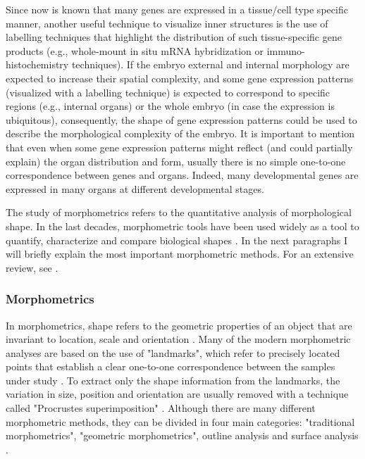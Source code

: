 Since now is known that many genes are expressed in a tissue/cell type specific manner, another useful technique to visualize inner structures is the use of labelling techniques that highlight the distribution of such tissue-specific gene products (e.g., whole-mount in situ mRNA hybridization or immuno-histochemistry techniques). 
If the embryo external and internal morphology are expected to increase their spatial complexity, and some gene expression patterns (visualized with a labelling technique) is expected to correspond to specific regions (e.g., internal organs) or the whole embryo (in case the expression is ubiquitous), consequently, the shape of gene expression patterns could be used to describe the morphological complexity of the embryo. It is important to mention that even when some gene expression patterns might reflect (and could partially explain) the organ distribution and form, usually there is no simple one-to-one correspondence between genes and organs. Indeed, many developmental genes are expressed in many organs at different developmental stages.

The study of morphometrics refers to the quantitative analysis of morphological shape. In the last decades, morphometric tools have been used widely as a tool to quantify, characterize and compare biological shapes \citep{JamesRohlf1993}. In the next paragraphs I will briefly explain the most important morphometric methods. For an extensive review, see \citep{Bookstein1997,Dryden1998,Zelditch2008,Slice2005}.


\subsubsection{Morphometrics}

In morphometrics, shape refers to the geometric properties of an object that are invariant to location, scale and orientation \citep{Slice2005}. Many of the modern morphometric analyses are based on the use of "landmarks", which refer to precisely located points that establish a clear one-to-one correspondence between the samples under study \citep{Klingenberg2010}. To extract only the shape information from the landmarks, the variation in size, position and orientation are usually removed with a technique called "Procrustes superimposition" \citep{Dryden1998}.
Although there are many different morphometric methods, they can be divided in four main categories: "traditional morphometrics", "geometric morphometrics", outline analysis and surface analysis \citep{Slice2005}.

